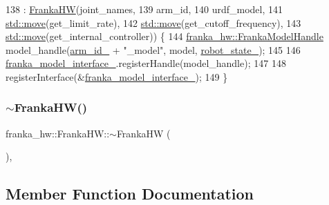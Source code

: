 \begin{DoxyCode}
138     : \hyperlink{classfranka__hw_1_1FrankaHW_a07f709fd8367ebf376214e4decf8cf57}{FrankaHW}(joint\_names,
139                arm\_id,
140                urdf\_model,
141                \hyperlink{namespacefranka__gripper_a1356a87108d2229401d3755bd3e53bdf}{std::move}(get\_limit\_rate),
142                \hyperlink{namespacefranka__gripper_a1356a87108d2229401d3755bd3e53bdf}{std::move}(get\_cutoff\_frequency),
143                \hyperlink{namespacefranka__gripper_a1356a87108d2229401d3755bd3e53bdf}{std::move}(get\_internal\_controller)) \{
144   \hyperlink{classfranka__hw_1_1FrankaModelHandle}{franka\_hw::FrankaModelHandle} model\_handle(\hyperlink{classfranka__hw_1_1FrankaHW_acb16f326973e2eb1c33c28f71492d7d5}{arm\_id\_} + \textcolor{stringliteral}{"\_model"}, model, 
      \hyperlink{classfranka__hw_1_1FrankaHW_a1b9c3149cda8b7d78d52ecea65a8ebab}{robot\_state\_});
145 
146   \hyperlink{classfranka__hw_1_1FrankaHW_ae4a34d7a0b75467c137d9820a37fea79}{franka\_model\_interface\_}.registerHandle(model\_handle);
147 
148   registerInterface(&\hyperlink{classfranka__hw_1_1FrankaHW_ae4a34d7a0b75467c137d9820a37fea79}{franka\_model\_interface\_});
149 \}
\end{DoxyCode}
\mbox{\label{classfranka__hw_1_1FrankaHW_ac8f6752340bb6ccb97a3b0f29d664516}} 
\subsubsection{\texorpdfstring{$\sim$\+Franka\+H\+W()}{~FrankaHW()}}
{\footnotesize\ttfamily franka\+\_\+hw\+::\+Franka\+H\+W\+::$\sim$\+Franka\+HW (\begin{DoxyParamCaption}{ }\end{DoxyParamCaption})\hspace{0.3cm}{\ttfamily [override]}, {\ttfamily [default]}}



\subsection{Member Function Documentation}
\mbox{\label{classfranka__hw_1_1FrankaHW_a73e581982455acacca51d81e4676e9a6}} 
